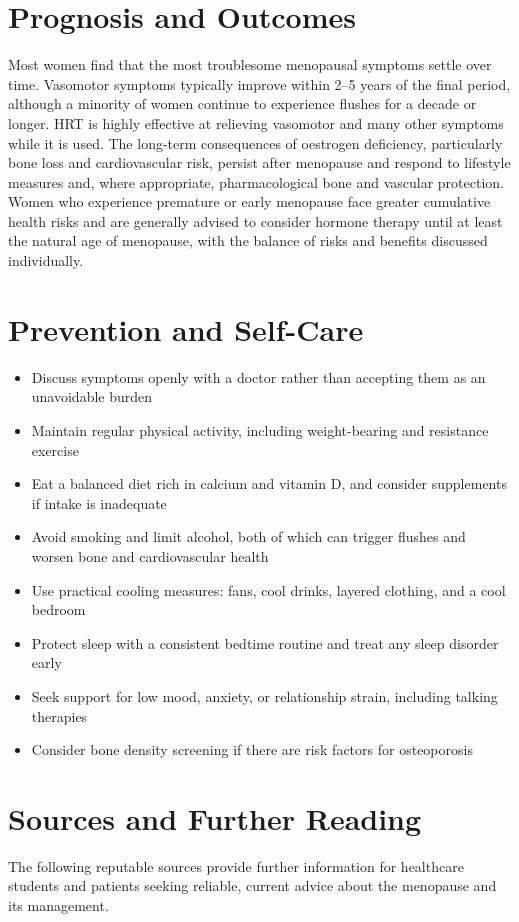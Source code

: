 \section*{Prognosis and Outcomes}
Most women find that the most troublesome menopausal symptoms settle over time. Vasomotor symptoms typically improve within 2--5 years of the final period, although a minority of women continue to experience flushes for a decade or longer. HRT is highly effective at relieving vasomotor and many other symptoms while it is used. The long-term consequences of oestrogen deficiency, particularly bone loss and cardiovascular risk, persist after menopause and respond to lifestyle measures and, where appropriate, pharmacological bone and vascular protection. Women who experience premature or early menopause face greater cumulative health risks and are generally advised to consider hormone therapy until at least the natural age of menopause, with the balance of risks and benefits discussed individually.

\section*{Prevention and Self-Care}
\begin{itemize}
    \item Discuss symptoms openly with a doctor rather than accepting them as an unavoidable burden
    \item Maintain regular physical activity, including weight-bearing and resistance exercise
    \item Eat a balanced diet rich in calcium and vitamin D, and consider supplements if intake is inadequate
    \item Avoid smoking and limit alcohol, both of which can trigger flushes and worsen bone and cardiovascular health
    \item Use practical cooling measures: fans, cool drinks, layered clothing, and a cool bedroom
    \item Protect sleep with a consistent bedtime routine and treat any sleep disorder early
    \item Seek support for low mood, anxiety, or relationship strain, including talking therapies
    \item Consider bone density screening if there are risk factors for osteoporosis
\end{itemize}

\section*{Sources and Further Reading}
The following reputable sources provide further information for healthcare students and patients seeking reliable, current advice about the menopause and its management.

